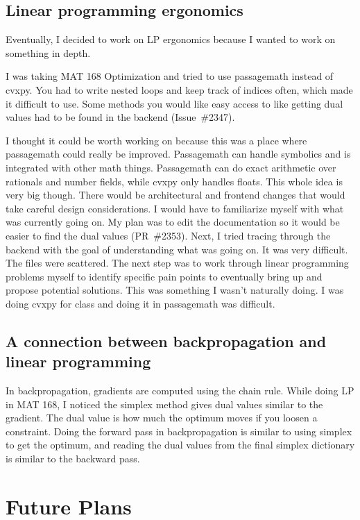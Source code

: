 \documentclass[10pt]{article}
\begin{document}
\subsection{Linear programming ergonomics}

Eventually, I decided to work on LP ergonomics because I wanted to work on something in depth.

I was taking MAT 168 Optimization and tried to use passagemath instead of cvxpy. You had to write nested loops and keep track of indices often, which made it difficult to use. Some methods you would like easy access to like getting dual values had to be found in the backend (Issue~\#2347).

I thought it could be worth working on because this was a place where passagemath could really be improved. Passagemath can handle symbolics and is integrated with other math things. Passagemath can do exact arithmetic over rationals and number fields, while cvxpy only handles floats. This whole idea is very big though. There would be architectural and frontend changes that would take careful design considerations. I would have to familiarize myself with what was currently going on. My plan was to edit the documentation so it would be easier to find the dual values (PR~\#2353). Next, I tried tracing through the backend with the goal of understanding what was going on. It was very difficult. The files were scattered. The next step was to work through linear programming problems myself to identify specific pain points to eventually bring up and propose potential solutions. This was something I wasn't naturally doing. I was doing cvxpy for class and doing it in passagemath was difficult.

\subsection{A connection between backpropagation and linear programming}

In backpropagation, gradients are computed using the chain rule. While doing LP in MAT 168, I noticed the simplex method gives dual values similar to the gradient. The dual value is how much the optimum moves if you loosen a constraint. Doing the forward pass in backpropagation is similar to using simplex to get the optimum, and reading the dual values from the final simplex dictionary is similar to the backward pass.

\section{Future Plans}
\end{document}
